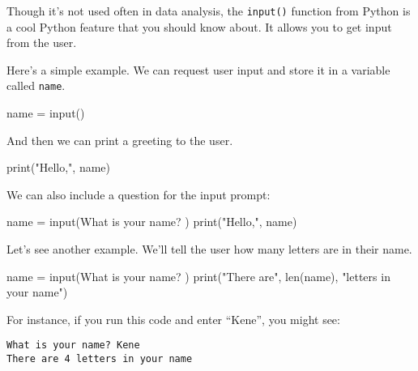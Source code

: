 \documentclass[
  letterpaper,
  DIV=11,
  numbers=noendperiod]{scrreprt}
\newenvironment{Shaded}{\begin{snugshade}}{\end{snugshade}}
\newcommand{\BuiltInTok}[1]{\textcolor[rgb]{0.00,0.23,0.31}{#1}}
\newcommand{\NormalTok}[1]{\textcolor[rgb]{0.00,0.23,0.31}{#1}}
\newcommand{\OperatorTok}[1]{\textcolor[rgb]{0.37,0.37,0.37}{#1}}
\newcommand{\StringTok}[1]{\textcolor[rgb]{0.13,0.47,0.30}{#1}}
\begin{document}
Though it's not used often in data analysis, the \texttt{input()}
function from Python is a cool Python feature that you should know
about. It allows you to get input from the user.

Here's a simple example. We can request user input and store it in a
variable called \texttt{name}.

\begin{Shaded}
\begin{Highlighting}[]
\NormalTok{name }\OperatorTok{=} \BuiltInTok{input}\NormalTok{()}
\end{Highlighting}
\end{Shaded}

And then we can print a greeting to the user.

\begin{Shaded}
\begin{Highlighting}[]
\BuiltInTok{print}\NormalTok{(}\StringTok{"Hello,"}\NormalTok{, name)}
\end{Highlighting}
\end{Shaded}

We can also include a question for the input prompt:

\begin{Shaded}
\begin{Highlighting}[]
\NormalTok{name }\OperatorTok{=} \BuiltInTok{input}\NormalTok{(}\StringTok{\textquotesingle{}What is your name? \textquotesingle{}}\NormalTok{)}
\BuiltInTok{print}\NormalTok{(}\StringTok{"Hello,"}\NormalTok{, name)}
\end{Highlighting}
\end{Shaded}

Let's see another example. We'll tell the user how many letters are in
their name.

\begin{Shaded}
\begin{Highlighting}[]
\NormalTok{name }\OperatorTok{=} \BuiltInTok{input}\NormalTok{(}\StringTok{\textquotesingle{}What is your name? \textquotesingle{}}\NormalTok{)}
\BuiltInTok{print}\NormalTok{(}\StringTok{"There are"}\NormalTok{, }\BuiltInTok{len}\NormalTok{(name), }\StringTok{"letters in your name"}\NormalTok{)}
\end{Highlighting}
\end{Shaded}

For instance, if you run this code and enter ``Kene'', you might see:

\begin{verbatim}
What is your name? Kene
There are 4 letters in your name
\end{verbatim}
\end{document}
